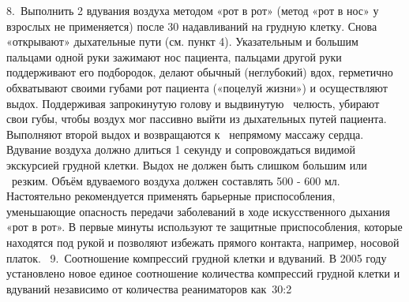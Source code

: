 \documentclass[a4paper, 12pt]{article}
\theoremstyle{definition}
\begin{document}
        8. Выполнить 2 вдувания воздуха методом «рот в рот» (метод «рот в нос» у взрослых не применяется) после 30 надавливаний на грудную клетку.
        Снова «открывают» дыхательные пути (см. пункт 4). Указательным и большим пальцами одной руки зажимают нос пациента, пальцами другой руки поддерживают его подбородок, делают обычный (неглубокий) вдох, герметично обхватывают своими губами рот пациента («поцелуй жизни») и осуществляют выдох. Поддерживая запрокинутую голову и выдвинутую  челюсть, убирают свои губы, чтобы воздух мог пассивно выйти из дыхательных путей пациента. Выполняют второй выдох и возвращаются к  непрямому массажу сердца.
        Вдувание воздуха должно длиться 1 секунду и сопровождаться видимой экскурсией грудной клетки. Выдох не должен быть слишком большим или  резким. Объём вдуваемого воздуха должен составлять 500 - 600 мл.
        Настоятельно рекомендуется применять барьерные приспособления, уменьшающие опасность передачи заболеваний в ходе искусственного дыхания «рот в рот». В первые минуты используют те защитные приспособления, которые находятся под рукой и позволяют избежать прямого контакта, например, носовой платок.
         9. Соотношение компрессий грудной клетки и вдуваний. В 2005 году установлено новое единое соотношение количества компрессий грудной клетки и вдуваний независимо от количества реаниматоров как 30:2
        
\end{document}
